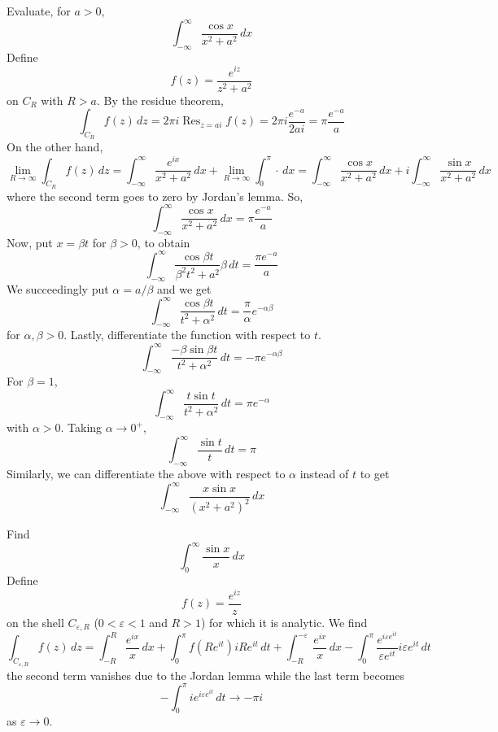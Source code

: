 \vspace{2ex}
\begin{ex}
Evaluate, for $a>0$,
\[\int ^{\infty }_{-\infty }\dfrac{\cos x}{x^2+a^2}\,dx\]
Define
\[f(z)=\dfrac{e^{iz}}{z^2+a^2}\]
on $C_{R}$ with $R>a$. By the residue theorem,
\[\int _{C_{R}}f(z)\,dz=2\pi i\mathop{\mathrm{Res}}_{z=ai}f(z)=2\pi i\dfrac{e^{-a}}{2ai}=\pi \dfrac{e^{-a}}{a}\]
On the other hand, 
\[\lim _{R\rightarrow \infty }\int _{C_{R}}f(z)\,dz=\int _{-\infty }^{\infty }\dfrac{e^{ix}}{x^2+a^2}\,dx+\lim _{R\rightarrow \infty }\int _{0}^{\pi }\cdot \,dx=\int ^{\infty }_{-\infty }\dfrac{\cos x}{x^2+a^2}\,dx+i\int ^{\infty }_{-\infty }\dfrac{\sin x}{x^2+a^2}\,dx\]
where the second term goes to zero by Jordan's lemma. So, 
\[\int ^{\infty }_{-\infty }\dfrac{\cos x}{x^2+a^2}\,dx=\pi \dfrac{e^{-a}}{a}\]
Now, put $x=\beta t$ for $\beta >0$, to obtain
\[\int ^{\infty }_{-\infty }\dfrac{\cos \beta t}{\beta ^2t^2+a^2}\beta \,dt=\dfrac{\pi e^{-a}}{a}\]
We succeedingly put $\alpha =a/\beta $ and we get
\[\int ^{\infty }_{-\infty }\dfrac{\cos \beta t}{t^2+\alpha ^2}\,dt=\dfrac{\pi }{\alpha }e^{-\alpha \beta }\]
for $\alpha ,\beta >0$. Lastly, differentiate the function with respect to $t$. 
\[\int ^{\infty }_{-\infty }\dfrac{-\beta \sin \beta t}{t^2+\alpha ^2}\,dt=-\pi e^{-\alpha \beta }\]
For $\beta =1$,
\[\int ^{\infty }_{-\infty }\dfrac{t\sin t}{t^2+\alpha ^2}\,dt=\pi e^{-\alpha }\]
with $\alpha >0$. Taking $\alpha \rightarrow 0^{+}$,
\[\int ^{\infty }_{-\infty }\dfrac{\sin t}{t}\,dt=\pi \]
Similarly, we can differentiate the above with respect to $\alpha $ instead of $t$ to get
\[\int ^{\infty }_{-\infty }\dfrac{x\sin x}{(x^2+a^2)^2}\,dx\]
\end{ex}
\vspace{2ex}
\begin{ex}
Find 
\[\int ^{\infty   }_{0}\dfrac{\sin x}{x}\,dx\]
Define
\[f(z)=\dfrac{e^{iz}}{z}\]
on the shell $C_{\varepsilon ,R}$ ($0<\varepsilon <1$ and $R>1$) for which it is analytic. We find
\[\int _{C_{\varepsilon ,R}}f(z)\,dz=\int ^{R}_{-R}\dfrac{e^{ix}}{x}\,dx+\int ^{\pi }_{0}f(Re^{it})iRe^{it}\,dt+\int _{-R}^{-\varepsilon }\dfrac{e^{ix}}{x}\,dx-\int ^{\pi }_{0}\dfrac{e^{i\varepsilon e^{it}}}{\varepsilon e^{it}}i\varepsilon e^{it}\,dt\]
the second term vanishes due to the Jordan lemma while the last term becomes
\[-\int ^{\pi }_{0}ie^{i\varepsilon e^{it}}\,dt\rightarrow -\pi i\]
as $\varepsilon \rightarrow 0$. 
\end{ex}
\vspace{2ex}

